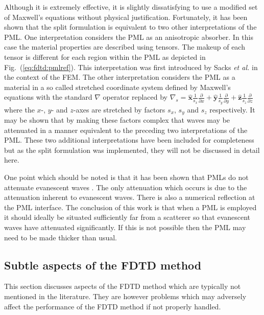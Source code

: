 \documentclass[a4paper, 12pt]{article}
\newcommand{\rfig}[1]{Fig.\ (\ref{#1})}
\begin{document}
	Although it is extremely effective, it is slightly dissatisfying to use
	a modified set of Maxwell's equations without physical
	justification. Fortunately, it has been shown that the split
	formulation is equivalent to two other interpretations of the PML. One
	interpretation considers the PML as an anisotropic absorber. In this
	case the material properties are described using tensors. The makeup
	of each tensor is different for each region within the PML as depicted
	in \rfig{eq:fdtd:pmlref}. This interpretation was first introduced by
	Sacks \emph{et al.} \cite{sacks95ieeetransantprop} in the context of the FEM. The other interpretation considers the
	PML as a material in a so called stretched coordinate system
	defined by Maxwell's equations with the standard $\nabla$ operator
	replaced by
	$\nabla_s=\hat{\mathbf{x}}\frac{1}{s_x}\frac{\partial}{\partial
		x}+\hat{\mathbf{y}}\frac{1}{s_y}\frac{\partial}{\partial
		y}+\hat{\mathbf{z}}\frac{1}{s_z}\frac{\partial}{\partial z}$
	\cite{jin02book} where
	the $x$-, $y$- and $z$-axes are stretched by factors $s_x$, $s_y$ and
	$s_z$ respectively. It may be shown that by making these factors
	complex that waves may be attenuated in a manner equivalent to the
	preceding two interpretations of the PML. These two additional
	interpretations have been included for completeness but as the split
	formulation was implemented, they will not be discussed in detail
	here.

	One point which should be noted is that it has been shown that PMLs do
	not attenuate evanescent waves
	\cite{moerloose95ieeemicguidwavlet,berenger99ieeetransantprop1497,berenger00intjournnummodel}.
	The only attenuation which occurs is due to the attenuation inherent
	to evanescent waves. There is also a numerical reflection at the PML
	interface. The conclusion of this work is that when a PML is employed
	it should ideally be situated sufficiently far from a scatterer so that
	evanescent waves have attenuated significantly. If this is not
	possible then the PML may need to be made thicker than usual.

	\subsection{Subtle aspects of the FDTD method}
	This section discusses aspects of the FDTD method which are typically not
	mentioned in the literature. They are however problems which may
	adversely affect the performance of the FDTD method if not properly
	handled.
\end{document}
